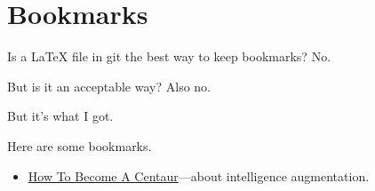 \chapter{Bookmarks}

Is a LaTeX file in git the best way to keep bookmarks? No.

But is it an acceptable way? Also no.

But it's what I got.

Here are some bookmarks.

\begin{itemize}
\item \href{https://jods.mitpress.mit.edu/pub/issue3-case}{How To Become A Centaur}---about intelligence augmentation.
\end{itemize}
